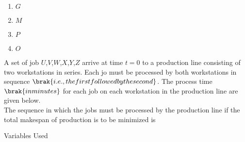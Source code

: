  \begin{enumerate}
     \item $G$\\
     \item $M$\\
     \item $P$\\
     \item $O$
 \end{enumerate}
 \item A set of job $U$,$V$,$W$,$X$,$Y$,$Z$ arrive at time $t=0$ to a production line consisting of two workstations in series. Each jo must be processed by both workstations in sequence $\brak{i.e., the first followed by the second}$. The process time $\brak{in minutes}$ for each job on each workstation in the production line are given below.\\

 The sequence in which the jobs must be processed by the production line if the total makespan of production is to be minimized is\\
\begin{table}[h!]    
  \centering
  
  \caption{Variables Used}
  \label{tab1-1.2-20}
\end{table}
 
